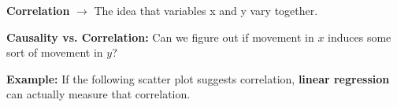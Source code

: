 \documentclass[english, 10pt]{article}
\begin{document}
\begin{tcolorbox}[title=Definition:,colframe=red!75!black,colback=red!5!white,arc=0pt,fonttitle=\bfseries]
\textbf{Correlation} $\rightarrow$ The idea that variables x and y vary together.
\end{tcolorbox}

\hfill \break \textbf{Causality vs. Correlation:} Can we figure out if movement in $x$ induces some sort of movement in $y$?\\

\begin{myproof}
\textbf{Example:} If the following scatter plot suggests correlation, \textbf{linear regression} can actually measure that correlation.\\

{
\centering




\begin{tikzpicture}[x=0.75pt,y=0.75pt,yscale=-1,xscale=1]


\end{tikzpicture}}
\end{myproof}
\end{document}
